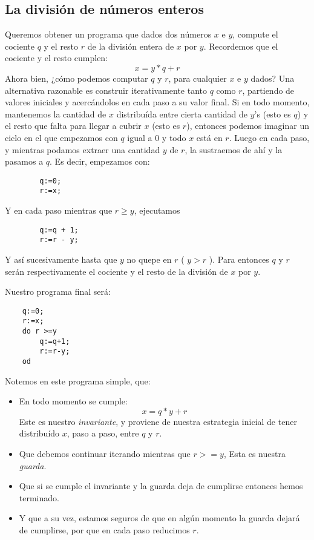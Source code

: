 \documentclass[12pt, a4paper, openany, fleqn]{book}
\begin{document}
    \subsection{La división de números enteros}
    Queremos obtener un programa que dados dos números $x$ e $y$, compute el cociente $q$ y el resto $r$ de la división entera de $x$ por $y$.
    Recordemos que el cociente y el resto cumplen:
    $$x = y * q + r$$
    Ahora bien, ¿cómo podemos computar $q$ y $r$, para cualquier $x$ e $y$ dados?
    Una alternativa razonable es construir iterativamente tanto $q$ como $r$, partiendo de valores iniciales y acercándolos en cada paso a su valor final.
    Si en todo momento, mantenemos la cantidad de $x$ distribuída entre cierta cantidad de $y$’s (esto es $q$) y el resto que falta para llegar a cubrir $x$ (esto es $r$), entonces podemos imaginar un ciclo en el que empezamos con $q$ igual a 0 y todo $x$ está en $r$.
    Luego en cada paso, y mientras podamos extraer una cantidad $y$ de $r$, la sustraemos de ahí y la pasamos a $q$.
    Es decir, empezamos con:
    \begin{verbatim}
        q:=0;
        r:=x;
    \end{verbatim}
    Y en cada paso mientras que $r \geq y$, ejecutamos
    \begin{verbatim}
        q:=q + 1;
        r:=r - y;
    \end{verbatim}

    Y así sucesivamente hasta que $y$ no quepe en $r$ ( $ y > r $ ). Para entonces $q$ y $r$ serán respectivamente el cociente y el resto de la división de $x$ por $y$.

    Nuestro programa final será:
    \begin{verbatim}
    q:=0;
    r:=x;
    do r >=y
        q:=q+1;
        r:=r-y;
    od
    \end{verbatim}
    Notemos en este programa simple, que:
    \begin{itemize}
        \item En todo momento se cumple:
        $$x = q * y + r$$
        Este es nuestro \textit{invariante}, y proviene de nuestra estrategia inicial de tener distribuído $x$, paso a paso, entre $q$ y $r$.
        \item Que debemos continuar iterando mientras que $r >= y$,
        Esta es nuestra \textit{guarda}.
        \item Que si se cumple el invariante y la guarda deja de cumplirse entonces hemos terminado.
        \item Y que a su vez, estamos seguros de que en algún momento la guarda dejará de cumplirse, por que en cada paso reducimos $r$.
    \end{itemize}
\end{document}
